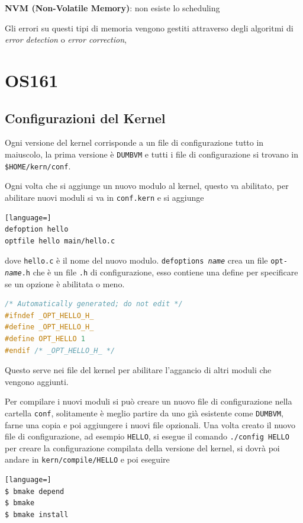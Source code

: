\documentclass[12pt]{article}
\begin{document}
\textbf{NVM (Non-Volatile Memory)}: non esiste lo scheduling

Gli errori su questi tipi di memoria vengono gestiti attraverso degli algoritmi di \emph{error detection} o \emph{error correction},  







\newpage
\section{OS161}
\subsection{Configurazioni del Kernel}
Ogni versione del kernel corrisponde a un file di configurazione tutto in maiuscolo, la prima versione \`e \texttt{DUMBVM} e tutti i file di configurazione si trovano in \texttt{\$HOME/kern/conf}.

Ogni volta che si aggiunge un nuovo modulo al kernel, questo va abilitato, per abilitare nuovi moduli si va in \texttt{conf.kern} e si aggiunge
\begin{lstlisting}[language=]
defoption hello
optfile hello main/hello.c
\end{lstlisting}
dove \texttt{hello.c} \`e il nome del nuovo modulo. \texttt{defoptions \emph{name}} crea un file \texttt{opt-\emph{name}.h} che \`e un file \texttt{.h} di configurazione, esso contiene una define per specificare se un opzione \`e abilitata o meno.
\begin{lstlisting}[language=c]
/* Automatically generated; do not edit */
#ifndef _OPT_HELLO_H_
#define _OPT_HELLO_H_
#define OPT_HELLO 1
#endif /* _OPT_HELLO_H_ */
\end{lstlisting}
Questo serve nei file del kernel per abilitare l'aggancio di altri moduli che vengono aggiunti.

Per compilare i nuovi moduli si pu\`o creare un nuovo file di configurazione nella cartella \texttt{conf}, solitamente \`e meglio partire da uno gi\`a esistente come \texttt{DUMBVM}, farne una copia e poi aggiungere i nuovi file opzionali. Una volta creato il nuovo file di configurazione, ad esempio \texttt{HELLO}, si esegue il comando \texttt{./config HELLO} per creare la configurazione compilata della versione del kernel, si dovr\`a poi andare in \texttt{kern/compile/HELLO} e poi eseguire
\begin{lstlisting}[language=]
$ bmake depend
$ bmake
$ bmake install
\end{lstlisting}
\end{document}
